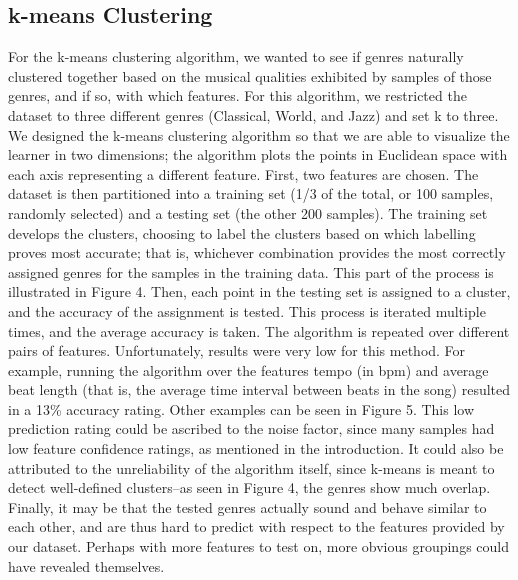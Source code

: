 \documentclass[11pt, twocolumn]{article}
\begin{document}
\subsection{k-means Clustering}
    For the k-means clustering algorithm, we wanted to see if genres naturally
clustered together based on the musical qualities exhibited by samples of those
genres, and if so, with which features. For this algorithm, we restricted the
dataset to three different genres (Classical, World, and Jazz) and set k to
three. We designed the k-means clustering algorithm so that we are able to
visualize the learner in two dimensions; the algorithm plots the points in
Euclidean space with each axis representing a different feature.
    First, two features are chosen. The dataset is then partitioned into a
training set (1/3 of the total, or 100 samples, randomly selected) and a
testing set (the other 200 samples). The training set develops the clusters,
choosing to label the clusters based on which labelling proves most accurate;
that is, whichever combination provides the most correctly assigned genres for
the samples in the training data. This part of the process is illustrated in
Figure 4. Then, each point in the testing set is assigned to a cluster, and the
accuracy of the assignment is tested. This process is iterated multiple times,
and the average accuracy is taken. The algorithm is repeated over different
pairs of features.
    Unfortunately, results were very low for this method. For example, running
the algorithm over the features tempo (in bpm) and average beat length (that
is, the average time interval between beats in the song) resulted in a 13\%
accuracy rating. Other examples can be seen in Figure 5. This low prediction
rating could be ascribed to the noise factor, since many samples had low
feature confidence ratings, as mentioned in the introduction. It could also be
attributed to the unreliability of the algorithm itself, since k-means is meant
to detect well-defined clusters--as seen in Figure 4, the genres show much
overlap. Finally, it may be that the tested genres actually sound and behave
similar to each other, and are thus hard to predict with respect to the
features provided by our dataset. Perhaps with more features to test on, more
obvious groupings could have revealed themselves.
\end{document}
